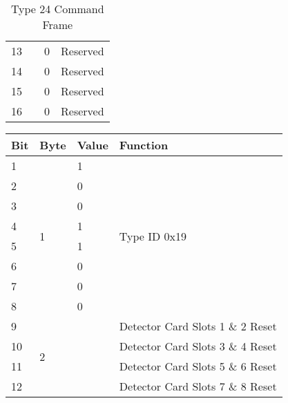 \documentclass[]{article}
\begin{document}
\begin{table}[ht]
\begin{tabular}{llll}
		13           &                    & 0                 & Reserved                         \\
		14           &                    & 0                 & Reserved                         \\
		15           &                    & 0                 & Reserved                         \\
		16           &                    & 0                 & Reserved                         \\ \hline
	\end{tabular}
	\caption{Type 24 Command Frame}
	\label{tab:type-24-frame}
\end{table}

\begin{table}[ht]
	\centering
	\begin{tabular}{llll}
		\hline
		\textbf{Bit} & \textbf{Byte}      & \textbf{Value}    & \textbf{Function}                \\ \hline
		1            & \multirow{8}{*}{1} & 1                 & \multirow{8}{*}{Type ID 0x19}    \\
		2            &                    & 0                 &                                  \\
		3            &                    & 0                 &                                  \\
		4            &                    & 1                 &                                  \\
		5            &                    & 1                 &                                  \\
		6            &                    & 0                 &                                  \\
		7            &                    & 0                 &                                  \\
		8            &                    & 0                 &                                  \\ \hline
		9            & \multirow{8}{*}{2} & \multirow{4}{*}{} & Detector Card Slots 1 \& 2 Reset \\
		10           &                    &                   & Detector Card Slots 3 \& 4 Reset \\
		11           &                    &                   & Detector Card Slots 5 \& 6 Reset \\
		12           &                    &                   & Detector Card Slots 7 \& 8 Reset \\ \cline{3-4} 

\end{tabular}
\end{table}
\end{document}
